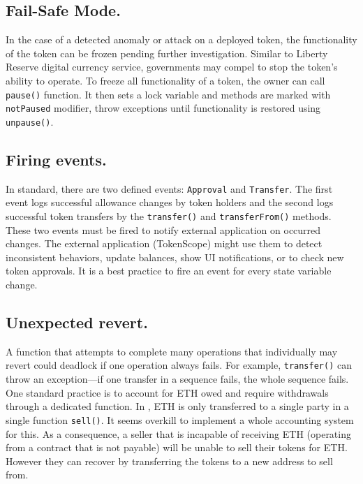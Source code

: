 \subsection{Fail-Safe Mode.}

In the case of a detected anomaly or attack on a deployed \erc token, the functionality of the token can be frozen pending further investigation. { \blue Similar to Liberty Reserve digital currency service\cite{LibertyReserve}, governments may compel to stop the token's ability to operate.} To freeze all functionality of a token, the owner can call \texttt{pause()} function. It then sets a lock variable and methods are marked with \texttt{notPaused} modifier, throw exceptions until functionality is restored using \texttt{unpause()}.


\subsection{Firing events.}

In \erc standard, there are two defined events: \texttt{Approval} and \texttt{Transfer}. The first event logs successful allowance changes by token holders and the second logs successful token transfers by the \texttt{transfer()} and \texttt{transferFrom()} methods. These two events must be fired to notify external application on occurred changes. The external application (\eg TokenScope\cite{TokenScope}) might use them to detect inconsistent behaviors, update balances, show UI notifications, or to check new token approvals. It is a best practice to fire an event for every state variable change.

\subsection{Unexpected revert.}

A function that attempts to complete many operations that individually may revert could deadlock if one operation always fails. For example, \texttt{transfer()} can throw an exception---if one transfer in a sequence fails, the whole sequence fails. One standard practice is to account for ETH owed and require withdrawals through a dedicated function. In \sys, ETH is only transferred to a single party in a single function \texttt{sell()}. It seems overkill to implement a whole accounting system for this. As a consequence, a seller that is incapable of receiving ETH (\eg operating from a contract that is not payable) will be unable to sell their tokens for ETH. However they can recover by transferring the tokens to a new address to sell from. 

